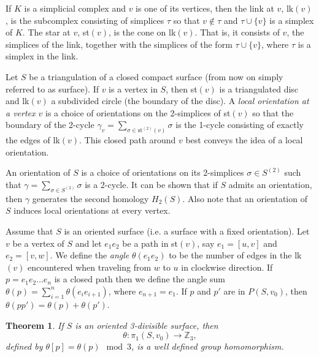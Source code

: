 \documentclass[12pt]{article}
\newtheorem{theorem}{Theorem}
\theoremstyle{definition}
\begin{document}
If $K$ is a simplicial complex and $v$ is one of its vertices, then the link at $v$, lk$(v)$, is the subcomplex consisting of simplices $\tau$ so that $v\not\in \tau$ and $\tau\cup\{ v \}$ is a simplex of $K$. The star at $v$, st$(v)$, is the cone on  lk$(v)$. That is, it consists of $v$, the simplices of the link, together with the simplices of the form  $\tau\cup \{ v\}$, where $\tau$ is a simplex in the link.

Let $S$ be a triangulation of a closed compact surface (from now on simply referred to as surface). If $v$ is a vertex in $S$, then st$(v)$ is a triangulated disc and lk$(v)$ a subdivided circle (the boundary of the disc). A \textit{local orientation at a vertex $v$} is a choice of orientations on the 2-simplices of st$(v)$ so that the boundary of the 2-cycle $\gamma_v=\sum_{\sigma\in\text{st}^{(2)}(v)}\sigma$ is the 1-cycle consisting of exactly the edges of lk$(v)$. This closed path around $v$ best conveys the idea of a local orientation. 

An orientation of $S$ is a choice of orientations on its 2-simplices $\sigma\in S^{(2)}$ such that $\gamma=\sum_{\sigma\in S^{(2)}}\sigma$ is a 2-cycle. It can be shown that if $S$ admits an orientation, then $\gamma$ generates the second homology $H_2(S)$. Also note that an orientation of $S$ induces local orientations at every vertex.

Assume that $S$ is an oriented surface (i.e. a surface with a fixed orientation). Let $v$ be a vertex of $S$ and let $e_1e_2$ be a path in st$(v)$, say $e_1=[u,v]$ and $e_2=[v,w]$. We define the \textit{angle} $\theta(e_1e_2)$ to be the number of edges in the lk$(v)$ encountered when traveling from $w$ to $u$ in clockwise direction. If $p=e_1e_2\ldots e_n$ is a closed path then we define the angle sum $\theta(p)=\sum_{i=1}^n \theta(e_ie_{i+1})$, where $e_{n+1}=e_1$. If $p$ and $p'$ are in $P(S,v_0)$, then $\theta(pp')=\theta(p)+\theta(p')$.

\begin{theorem}
    If $S$ is an oriented 3-divisible surface, then 
    $$\theta\colon \pi_1(S,v_0)\to \mathbb Z_3,$$ defined by $\theta[p]=\theta(p)\mod3$, is a well defined group homomorphism.
\end{theorem}
\end{document}
